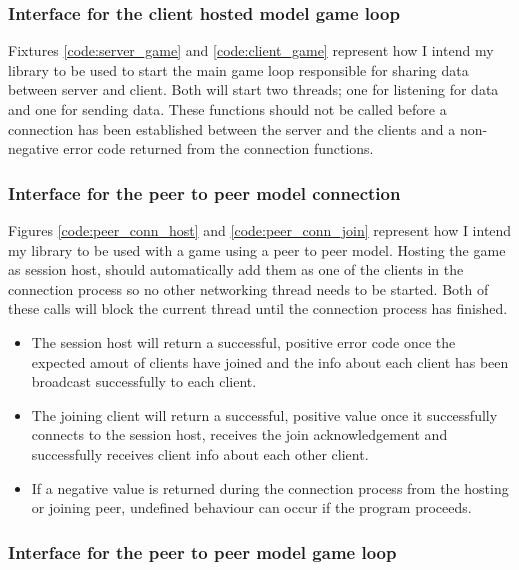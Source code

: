 


\newpage
\subsubsection{Interface for the client hosted model game loop}
Fixtures \ref{code:server_game} and \ref{code:client_game} represent how I intend my library to be used to start the main game loop responsible for sharing data between server and client. Both will start two threads; one for listening for data and one for sending data. These functions should not be called before a connection has been established between the server and the clients and a non-negative error code returned from the connection functions.




\newpage
\subsubsection{Interface for the peer to peer model connection}
Figures \ref{code:peer_conn_host} and \ref{code:peer_conn_join} represent how I intend my library to be used with a game using a peer to peer model. Hosting the game as session host, should automatically add them as one of the clients in the connection process so no other networking thread needs to be started. Both of these calls will block the current thread until the connection process has finished.



\begin{itemize}
\item The session host will return a successful, positive error code once the expected amout of clients have joined and the info about each client has been broadcast successfully to each client.
\item The joining client will return a successful, positive value once it successfully connects to the session host, receives the join acknowledgement and successfully receives client info about each other client.
\item If a negative value is returned during the connection process from the hosting or joining peer, undefined behaviour can occur if the program proceeds.
\end{itemize}


\newpage
\subsubsection{Interface for the peer to peer model game loop}

